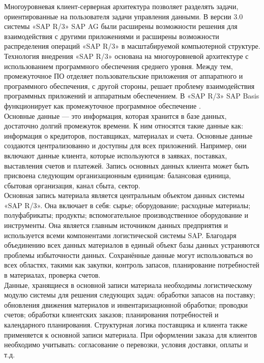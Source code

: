 \indent Многоуровневая клиент-серверная архитектура позволяет разделять задачи, ориентированные на пользователя задачи управления данными. 
В версии 3.0 системы «SAP R/3» SAP AG были расширены возможности решения для взаимодействия с другими приложениями и расширены возможности распределения операций «SAP R/3» в масштабируемой компьютерной структуре. 
Технология внедрения «SAP R/3» основана на многоуровневой архитектуре с использованием программного обеспечения среднего уровня. 
Между тем, промежуточное ПО отделяет пользовательские приложения от аппаратного и программного обеспечения, с другой стороны, решает проблему взаимодействия программных приложений и аппаратным обеспечением. 
В «SAP R/3» SAP Basis функционирует как промежуточное программное обеспечение \cite{mazBook}.\\
\indent Основные данные — это информация, которая хранится в базе данных, достаточно долгий промежуток времени. 
К ним относятся такие данные как: информация о кредиторов, поставщиках, материалах и счета. 
Основные данные создаются централизованно и доступны для всех приложений. 
Например, они включают данные клиента, которые используются в заявках, поставках, выставления счетов и платежей. 
Запись основных данных клиента может быть присвоена следующим организационным единицам: балансовая единица, сбытовая организация, канал сбыта, сектор.\\
\indent Основная запись материала является центральным объектом данных системы «SAP R/3». 
Она включает в себя: сырье; оборудование; расходные материалы; полуфабрикаты; продукты; вспомогательное производственное оборудование и инструменты. 
Она является главным источником данных предприятия и используется всеми компонентами логистической системы SAP. 
Благодаря объединению всех данных материалов в единый объект базы данных устраняются проблемы избыточности данных. 
Сохранённые данные могут использоваться во всех областях, такими как закупки, контроль запасов, планирование потребностей в материалах, проверка счетов.\\
\indent Данные, хранящиеся в основной записи материала необходимы логистическому модулю системы для решения следующих задач: обработки запасов на поставку; обновления движения материалов и инвентаризационной обработки; проводки счетов; обработки клиентских заказов; планирования потребностей и календарного планирования. 
Структурная логика поставщика и клиента также применяется к основной записи материала. 
При оформлении заказа для клиентов необходимо учитывать: согласование о перевозки, условия доставки, оплаты и т.д. 

